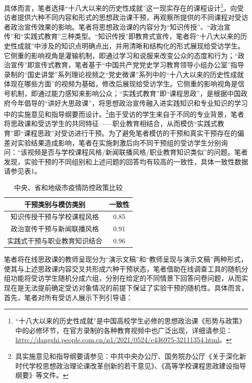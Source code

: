 \documentclass[
  12pt,
]{ctexart}
\begin{document}
具体而言，笔者选择``十八大以来的历史性成就''这一现实存在的课程设计\footnote{``十八大以来的历史性成就''是中国高校学生必修的思想政治课《形势与政策》中的必修环节，在官方录制的各种教育视频中也广泛出现，详细请参见：\url{http://dangshi.people.com.cn/n1/2021/0524/c436975-32111354.html}。}，向受访者提供六种不同内容和形式的思想政治课干预，再观察所提供的不同课程对受访者政治宣传效果的影响。笔者将思想政治课的内容分为``知识传授''、``政治宣传''和``实践式教育''三种类型。``知识传授''即教育式宣传，笔者将``十八大以来的历史性成就''中涉及的知识点明确点出，并用清晰和结构化的形式展现给受访学生。它侧重的影响视角是灌输机制，即通过学习和说服来改变公众的态度和行为；``政治宣传''即宣传式教育，笔者基于``中国共产党党史学习教育领导小组办公室''指导录制的``国史讲堂''系列理论视频之``党史微课''系列中的``十八大以来的历史性成就体现在哪些方面''的视频为基础，修改后展现给受访学生。它侧重的影响视角是信号机制，即通过能力感知来影响公众；``实践式教育''即``课程思政''，是根据中国政府今年倡导的``讲好大思政课''，将思想政治宣传融入进实践知识和专业知识的学习中的实施意见和指导纲要而设计。\footnote{具实施意见和指导纲要请参见：中共中央办公厅、国务院办公厅《关于深化新时代学校思想政治理论课改革创新的若干意见》、《高等学校课程思政建设指导纲要》等文件。}由于受访的学生来自于不同的专业背景，笔者将思政课和受访学生的共同特征------职业教育相结合，从而模仿``实践式教育''即``课程思政''对受访进行干预。为了避免笔者模仿的干预和真实干预存在的偏差对实验结果造成影响，笔者在实施刺激后向不同干预组的受访学生分别询问：``该视频是否与学校课程风格/新闻联播风格/职业教育知识类似''的问题。笔者发现，实验干预的不同组别和上述问题的回答均有较高的一致性，具体一致性数据请参见表1。

\begin{table}[!h]

\caption{\label{tab:unnamed-chunk-3}中央、省和地级市疫情防控政策比较}
\centering
\begin{tabular}[t]{cc}
\toprule
干预类别与模仿类别 & 一致性\\
\midrule
知识传授干预与学校课程风格 & 0.85\\
政治宣传干预与新闻联播风格 & 0.91\\
实践式干预与职业教育知识结合 & 0.96\\
\bottomrule
\end{tabular}
\end{table}

笔者将在线思政课的教师呈现分为``演示文稿''和``教师呈现与演示文稿''两种形式，使其与上述思政课内容交叉共形成六种干预状态，笔者借助在线调查工具的随机分组功能将受访学生随机分成六组，分别在给定的不同情景下回答问卷问题，从而实现在是无法提前确定受访对象情况的前提下保证了实验干预的随机性。具体而言，首先，笔者对所有受访人展示下列引导语：
\end{document}
